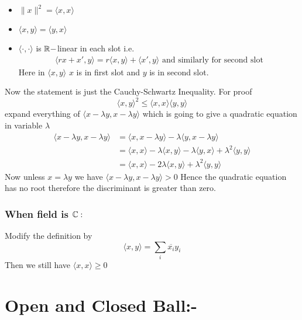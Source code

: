 {	\begin{note}
		\begin{itemize}
			\item $\|x\|^2=\langle x,x\rangle$
			\item $\langle x,y\rangle=\langle y,x\rangle$
			\item $\langle \cdot,\cdot\rangle$ is $\mathbb{R}-$linear in each slot i.e. \begin{align*}
				\langle rx+x',y\rangle=r\langle x,y\rangle+\langle x',y\rangle	\text{ and similarly for second slot}
			\end{align*}Here in $\langle x,y\rangle$ $x$ is in first slot and $y$ is in second slot.
		\end{itemize}
	\end{note}Now the statement is just the Cauchy-Schwartz Inequality. For proof $$\langle x,y\rangle^2\leq \langle x,x\rangle\langle y,y\rangle $$ expand everything of $\langle x-\lambda y,x-\lambda y\rangle$ which is going to give a quadratic equation in variable $\lambda $ \begin{align*}
		\langle x-\lambda y,x-\lambda y\rangle & =\langle x,x-\lambda y\rangle-\lambda\langle y,x-\lambda y\rangle                                       \\
		& =\langle x ,x\rangle -\lambda\langle x,y\rangle -\lambda\langle y,x\rangle +\lambda^2\langle y,y\rangle \\
		& =\langle x,x\rangle -2\lambda\langle x,y\rangle+\lambda^2\langle y,y\rangle
	\end{align*}Now unless $x=\lambda y$ we have $\langle x-\lambda y,x-\lambda y\rangle>0$ Hence the quadratic equation has no root therefore the discriminant is greater than zero.
	
	\subsubsection*{\textbf{When field is $\mathbb{C}:$}}Modify the definition by $$\langle x,y\rangle=\sum_i\overline{x_i}y_i$$Then we still have $\langle x,x\rangle\geq 0$}
\section{Open and Closed Ball:-}


